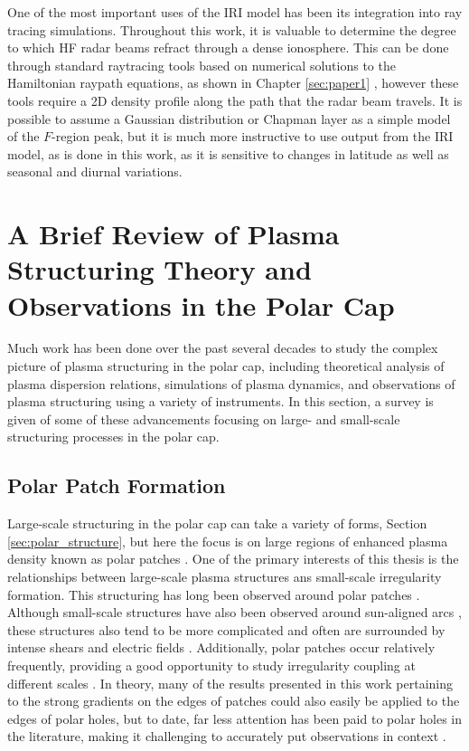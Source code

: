 One of the most important uses of the IRI model has been its integration into ray tracing simulations.  Throughout this work, it is valuable to determine the degree to which HF radar beams refract through a dense ionosphere.  This can be done through standard raytracing tools based on numerical solutions to the Hamiltonian raypath equations, as shown in Chapter \ref{sec:paper1} \citep{Haselgrove1963,Jones1975}, however these tools require a 2D density profile along the path that the radar beam travels.  It is possible to assume a Gaussian distribution or Chapman layer as a simple model of the \(F\)-region peak, but it is much more instructive to use output from the IRI model, as is done in this work, as it is sensitive to changes in latitude as well as seasonal and diurnal variations.

\section{A Brief Review of Plasma Structuring Theory and Observations in the Polar Cap}
Much work has been done over the past several decades to study the complex picture of plasma structuring in the polar cap, including theoretical analysis of plasma dispersion relations, simulations of plasma dynamics, and observations of plasma structuring using a variety of instruments.  In this section, a survey is given of some of these advancements focusing on large- and small-scale structuring processes in the polar cap.

\subsection{Polar Patch Formation}
\label{sec:lit_patches}
Large-scale structuring in the polar cap can take a variety of forms, Section \ref{sec:polar_structure}, but here the focus is on large regions of enhanced plasma density known as polar patches  \citep[e.g.][]{Weber1984,Weber1986,Buchau1983,Buchau1985}.  One of the primary interests of this thesis is the relationships between large-scale plasma structures ans small-scale irregularity formation.  This structuring has long been observed around polar patches \citep{Weber1984,Milan2002b,Moen2012}.  Although small-scale structures have also been observed around sun-aligned arcs \citep[e.g.][]{Koustov2012}, these structures also tend to be more complicated and often are surrounded by intense shears and electric fields \citep{Safargaleev2000,Aikio2002,Kozlovsky2007}.  Additionally, polar patches occur relatively frequently, providing a good opportunity to study irregularity coupling at different scales \citep{Rodger1996}.  In theory, many of the results presented in this work pertaining to the strong gradients on the edges of patches could also easily be applied to the edges of polar holes, but to date, far less attention has been paid to polar holes in the literature, making it challenging to accurately put observations in context \citep{Makarevich2015}.

